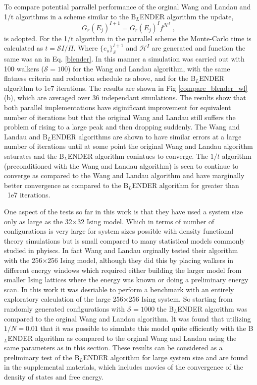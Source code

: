 \documentclass[aps,pre,reprint,superscriptaddress,showkeys]{revtex4-2}
\begin{document}
 To compare potential parrallel performance of the orginal Wang and Landau and 1/t algorithms in a scheme similar to the B$_L$ENDER algorithm the update,
\begin{equation}
G_r(E_j)^{I+1} = G_r(E_j)^{I}f^{\mathcal{H}^I}\;,
\label{parallelscheme}
\end{equation}
is adopted. For the 1/t algorithm in the parrallel scheme the Monte-Carlo time is calculated as $t = \mathcal{S}I/\Pi$. Where $\{e_s\}^{I+1}_{\mathcal{S}}$ and $\mathcal{H}^I$ are generated and function the same was an in Eq. \ref{blender}. In this manner a simulation was carried out with 100 walkers ($\mathcal{S}=100$) for the Wang and Landau algorithm, with the same flatness criteria and reduction schedule as above, and for the B$_L$ENDER algorithm to 1e7 iterations. The results are shown in Fig \ref{compare_blender_wl}(b), which are averaged over 36 independant simulations. The results show that both parallel implementations have siginificant improvement for equivalent number of iterations but that the original Wang and Landau still suffers the problem of rising to a large peak and then dropping suddenly. The Wang and Landau and B$_L$ENDER algorithms are shown to have similar errors at a large number of iterations until at some point the original Wang and Landau algorithm saturates and the B$_L$ENDER algorithm conintues to converge. The $1/t$ algorithm (preconditioned with the Wang and Landau algorithm) is seen to continue to converge as compared to the Wang and Landau algorithm and have marginally better convergence as compared to the B$_L$ENDER algorithm for greater than ~1e7 iterations. 

  One aspect of the tests so far in this work is that they have used a system size only as large as the 32$\times$32 Ising model.  Which in terms of number of configurations is very large for system sizes possible with density functional theory simulations but is small compared to many statistical models commonly studied in phyiscs.  In fact Wang and Landau orginally tested their algorithm with the 256$\times$256 Ising model\cite{WL_phys_rev_lett}, although they did this by placing walkers in different energy windows which required either building the larger model from smaller Ising lattices where the energy was known or doing a preliminary energy scan.  In this work it was desriable to perform a benchmark with an entirely exploratory calculation of the large 256$\times$256 Ising system. So starting from randomly generated configurations with $\mathcal{S}=1000$ the B$_L$ENDER algorithm was compared to the orginal Wang and Landau algorithm. It was found that utilizing $1/N=0.01$ that it was possible to simulate this model quite efficiently with the B$_L$ENDER algorithm as compared to the orginal Wang and Landau using the same parameters as in this section. These results can be considered as a preliminary test of the B$_L$ENDER algorithm for large system size and are found in the supplemental materials, which includes movies of the convergence of the density of states and free energy. 
\end{document}

